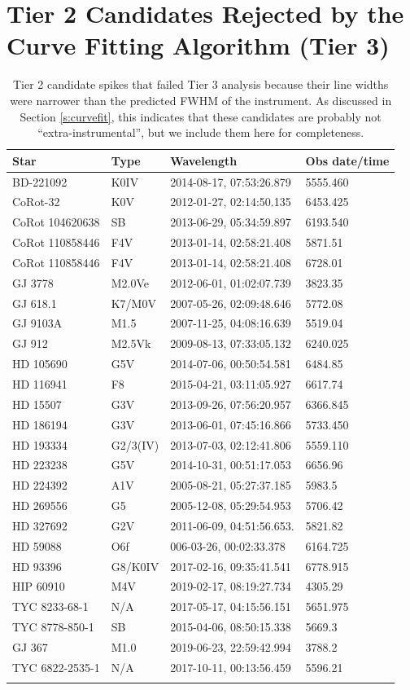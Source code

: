 \documentclass[twocolumn]{aastex701}
\begin{document}
\section{Tier 2 Candidates Rejected by the Curve Fitting Algorithm (Tier 3)}
\label{s:rejects}
\begin{longtable}{|l|l|l|l|} 
\label{t:tier3rejects} \\
 \hline
 Star & Type & Wavelength & Obs date/time \\
 \hline
 BD-221092 & K0IV & 2014-08-17, 07:53:26.879 & 5555.460 \\
 CoRot-32 & K0V & 2012-01-27, 02:14:50.135 & 6453.425 \\
 CoRot  104620638 & SB & 2013-06-29, 05:34:59.897 & 6193.540 \\
 CoRot  110858446 & F4V & 2013-01-14, 02:58:21.408 & 5871.51 \\
 CoRot  110858446 & F4V & 2013-01-14, 02:58:21.408 & 6728.01  \\
 GJ 3778 & M2.0Ve & 2012-06-01, 01:02:07.739 & 3823.35  \\
 GJ 618.1 & K7/M0V & 2007-05-26, 02:09:48.646 & 5772.08  \\
 GJ 9103A & M1.5 & 2007-11-25, 04:08:16.639 & 5519.04  \\
 GJ 912 & M2.5Vk & 2009-08-13, 07:33:05.132 & 6240.025  \\
 HD 105690 & G5V & 2014-07-06, 00:50:54.581 & 6484.85 \\
 HD 116941 & F8 & 2015-04-21, 03:11:05.927 & 6617.74 \\
 HD 15507 & G3V & 2013-09-26, 07:56:20.957 & 6366.845 \\
 HD 186194 & G3V & 2013-06-01, 07:45:16.866 & 5733.450  \\
 HD 193334 & G2/3(IV) & 2013-07-03, 02:12:41.806 & 5559.110  \\
 HD 223238 & G5V & 2014-10-31, 00:51:17.053 & 6656.96  \\
 HD 224392 & A1V & 2005-08-21, 05:27:37.185 & 5983.5  \\
 HD 269556 & G5 & 2005-12-08, 05:29:54.953 & 5706.42  \\
 HD 327692 & G2V & 2011-06-09, 04:51:56.653. & 5821.82  \\
 HD 59088 & O6f & 006-03-26, 00:02:33.378 & 6164.725  \\
 HD 93396 & G8/K0IV & 2017-02-16, 09:35:41.541 & 6778.915  \\
 HIP 60910 & M4V & 2019-02-17, 08:19:27.734 & 4305.29  \\
 TYC 8233-68-1 & N/A & 2017-05-17, 04:15:56.151 & 5651.975  \\
 TYC 8778-850-1 & SB & 2015-04-06, 08:50:15.338 & 5669.3  \\
 GJ 367 & M1.0 & 2019-06-23, 22:59:42.994 & 3788.2  \\
 TYC 6822-2535-1 & N/A & 2017-10-11, 00:13:56.459 & 5596.21  \\
\hline
 \caption{Tier 2 candidate spikes that failed Tier 3 analysis because their line widths were narrower than the predicted FWHM of the instrument. As discussed in Section \ref{s:curvefit}, this indicates that these candidates are probably not \enquote{extra-instrumental}, but we include them here for completeness.} 
\end{longtable}
\end{document}
